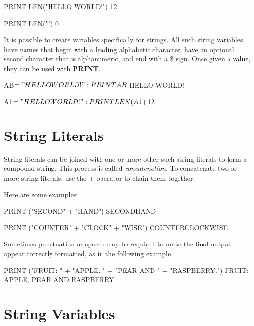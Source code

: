 \begin{screencode}
PRINT LEN("HELLO WORLD!")
 12
\end{screencode}

\begin{screencode}
PRINT LEN("")
 0
\end{screencode}

It is possible to create variables specifically for strings. All such string variables have names that begin with a leading alphabetic character, have an optional second character that is alphanumeric, and end with a \$ sign. Once given a value, they can be used with {\bf PRINT}.

\begin{screencode}
AB$ = "HELLO WORLD!": PRINT AB$
HELLO WORLD!
\end{screencode}

\begin{screencode}
A1$ = "HELLO WORLD!": PRINT LEN(A1$)
 12
\end{screencode}

\section{String Literals}
String literals can be joined with one or more other such string literals to form a compound string. This process is called {\it concatenation}. To concatenate two or more string literals, use the + operator to chain them together.

Here are some examples:

\begin{screencode}
PRINT ("SECOND" + "HAND")
SECONDHAND
\end{screencode}

\begin{screencode}
PRINT ("COUNTER" + "CLOCK" + "WISE")
COUNTERCLOCKWISE
\end{screencode}

Sometimes punctuation or spaces may be required to make the final output appear correctly formatted, as in the following example.

\begin{screencode}
PRINT ("FRUIT: " + "APPLE, " + "PEAR AND " + "RASPBERRY.")
FRUIT: APPLE, PEAR AND RASPBERRY.
\end{screencode}

\section{String Variables}

